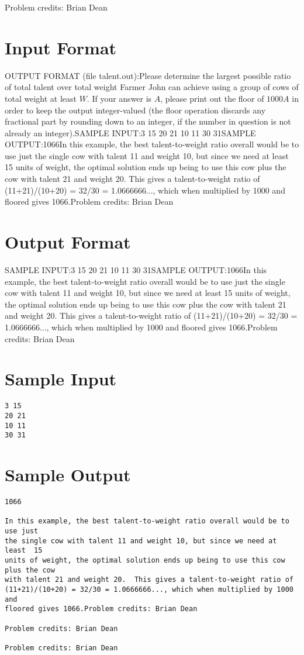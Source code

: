 \documentclass[12pt]{article}
\begin{document}
Problem credits: Brian Dean



\section*{Input Format}
OUTPUT FORMAT (file talent.out):Please determine the largest possible ratio of total talent over total weight
Farmer John can achieve using a group of cows of total weight at least $W$.  If
your answer is $A$, please print out the floor of $1000A$ in order to keep the
output integer-valued (the floor operation discards any fractional part by
rounding down to an integer, if the number in question is not already an
integer).SAMPLE INPUT:3 15
20 21
10 11
30 31SAMPLE OUTPUT:1066In this example, the best talent-to-weight ratio overall would be to use just
the single cow with talent 11 and weight 10, but since we need at least  15
units of weight, the optimal solution ends up being to use this cow plus the cow
with talent 21 and weight 20.  This gives a talent-to-weight ratio of
(11+21)/(10+20) = 32/30 = 1.0666666..., which when multiplied by 1000 and
floored gives 1066.Problem credits: Brian Dean

\section*{Output Format}
SAMPLE INPUT:3 15
20 21
10 11
30 31SAMPLE OUTPUT:1066In this example, the best talent-to-weight ratio overall would be to use just
the single cow with talent 11 and weight 10, but since we need at least  15
units of weight, the optimal solution ends up being to use this cow plus the cow
with talent 21 and weight 20.  This gives a talent-to-weight ratio of
(11+21)/(10+20) = 32/30 = 1.0666666..., which when multiplied by 1000 and
floored gives 1066.Problem credits: Brian Dean

\section*{Sample Input}
\begin{verbatim}
3 15
20 21
10 11
30 31
\end{verbatim}

\section*{Sample Output}
\begin{verbatim}
1066

In this example, the best talent-to-weight ratio overall would be to use just
the single cow with talent 11 and weight 10, but since we need at least  15
units of weight, the optimal solution ends up being to use this cow plus the cow
with talent 21 and weight 20.  This gives a talent-to-weight ratio of
(11+21)/(10+20) = 32/30 = 1.0666666..., which when multiplied by 1000 and
floored gives 1066.Problem credits: Brian Dean

Problem credits: Brian Dean

Problem credits: Brian Dean
\end{verbatim}
\end{document}

